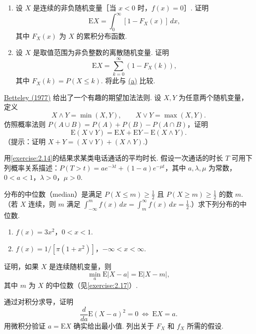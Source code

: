 \begin{exercise}\label{exercise:2.14}\leavevmode
\begin{enumerate}
\item[(a)]\label{itm:exercise:2.14:a} 设 $X$ 是连续的非负随机变量［当 $x<0$ 时，$f(x)=0$］. 证明
$$\mathrm EX=\int_0^\infty[1-F_X(x)]\,dx,$$
其中 $F_X(x)$ 为 $X$ 的累积分布函数.
\item[(b)] 设 $X$ 是取值范围为非负整数的离散随机变量. 证明
$$\mathrm EX=\sum_{k=0}^\infty(1-F_X(k)),$$
其中 $F_X(k)=P(X\le k)$. 将此与 \hyperref[itm:exercise:2.14:a]{(a)} 比较.
\end{enumerate}
\end{exercise}
\begin{exercise}\label{exercise:2.15}
\hyperref[bib:source30]{Betteley (1977)} 给出了一个有趣的期望加法法则. 设 $X,Y$ 为任意两个随机变量，定义
$$X\wedge Y=\min(X,Y),\qquad X\vee Y=\max(X,Y).$$
仿照概率法则 $P(A\cup B)=P(A)+P(B)-P(A\cap B)$，证明
$$\mathrm E(X\vee Y)=\mathrm EX+\mathrm EY-\mathrm E(X\wedge Y).$$
（提示：证明 $X+Y=(X\vee Y)+(X\wedge Y)$.）
\end{exercise}
\begin{exercise}\label{exercise:2.16}
用\autoref{exercise:2.14}的结果求某类电话通话的平均时长. 假设一次通话的时长 $T$ 可用下列概率关系描述：$P(T>t)=ae^{-\lambda t}+(1-a)e^{-\mu t}$，其中 $a,\lambda,\mu$ 为常数，$0<a<1$，$\lambda>0$，$\mu>0$.
\end{exercise}
\begin{exercise}\label{exercise:2.17}
分布的中位数（median）是满足 $P(X\le m)\ge\frac12$ 且 $P(X\ge m)\ge\frac12$ 的数 $m$. （若 $X$ 连续，则 $m$ 满足 $\int_{-\infty}^m f(x)\,dx=\int_m^\infty f(x)\,dx=\frac12$.）求下列分布的中位数.
\begin{enumerate}
\item[(a)] $f(x)=3x^2$，$0<x<1$.
\item[(b)] $f(x)=1/[\pi(1+x^2)]$，$-\infty<x<\infty$.
\end{enumerate}
\end{exercise}
\begin{exercise}\label{exercise:2.18}
证明，如果 $X$ 是连续随机变量，则
$$\min_a\mathrm E|X-a|=\mathrm E|X-m|,$$
其中 $m$ 为 $X$ 的中位数（见\autoref{exercise:2.17}）.
\end{exercise}
\begin{exercise}\label{exercise:2.19}
通过对积分求导，证明
$$\frac d{da}\mathrm E(X-a)^2=0\ \Longleftrightarrow\ \mathrm EX=a.$$
用微积分验证 $a=\mathrm EX$ 确实给出最小值. 列出关于 $F_X$ 和 $f_X$ 所需的假设.
\end{exercise}
